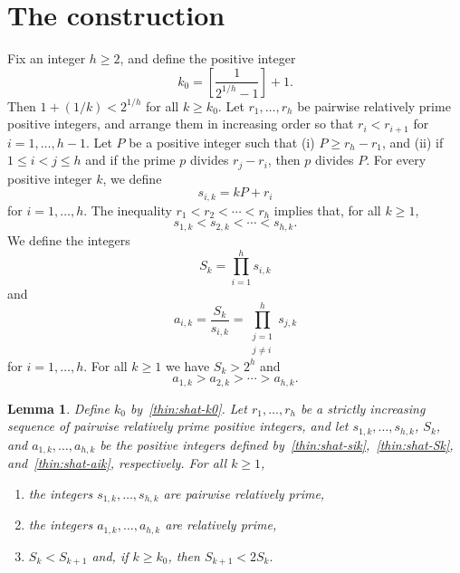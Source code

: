 \documentclass{amsart}
\newtheorem{lemma}{Lemma}
\begin{document}
\section{The construction}
Fix an integer $h \geq 2$,  and define the positive integer 
\begin{equation}    \label{thin:shat-k0}
k_0 = \left[ \frac{1}{2^{1/h}-1} \right] + 1.
\end{equation}
Then  $1 + (1/k) < 2^{1/h}$ for all $k \geq k_0.$  
Let $r_1,\ldots, r_h$ be pairwise relatively prime positive integers, and arrange them in increasing order so that $r_i < r_{i+1}$ for $i = 1,\ldots, h-1$.   Let $P$ be a positive integer such that (i) $P \geq r_h - r_1$, and (ii) if $1 \leq i < j \leq h$ and if the prime $p$ divides $r_j-r_i$, then $p$ divides $P$.  
For every positive integer $k$, we define 
\begin{equation}    \label{thin:shat-sik}
s_{i,k} = kP+r_i
\end{equation}
for $i = 1,\ldots,h$.    The inequality $r_1 < r_2 < \cdots < r_h$ implies  that, for all $k \geq 1$, 
\[
s_{1,k} < s_{2,k} < \cdots < s_{h,k}.
\]
We define the integers 
\begin{equation}    \label{thin:shat-Sk}
S_k = \prod_{i=1}^h s_{i,k}
\end{equation}
and
\begin{equation}    \label{thin:shat-aik}
a_{i,k} = \frac{S_k}{s_{i,k}} = \prod_{\substack{ j=1 \\ j\neq i}}^h s_{j,k}
\end{equation}
for $i=1,\ldots, h$.   For all $k \geq 1$ we have $S_k > 2^h$ and
\[
a_{1,k} > a_{2,k} > \cdots > a_{h,k}.
\]

\begin{lemma}     \label{thin:lemma:shat1}
Define $k_0$ by~\eqref{thin:shat-k0}.  Let $r_1,\ldots, r_h$ be a strictly increasing sequence of pairwise relatively prime positive integers, and let $s_{1,k},\ldots, s_{h,k}$, $S_k$, and $a_{1,k},\ldots, a_{h,k}$ be the positive integers defined by~\eqref{thin:shat-sik},~\eqref{thin:shat-Sk}, and~\eqref{thin:shat-aik}, respectively.  
For all $k \geq 1$,
\begin{enumerate}
\item[(i)]
the integers $s_{1,k},  \ldots, s_{h,k}$ are pairwise relatively prime,  
\item[(ii)]
the integers $a_{1,k},  \ldots, a_{h,k}$ are relatively prime, 
\item[(iii)]
 $S_k < S_{k+1}$ and, if $k \geq k_0$, then $S_{k+1} < 2S_k.$
\end{enumerate}
\end{lemma}
\end{document}
